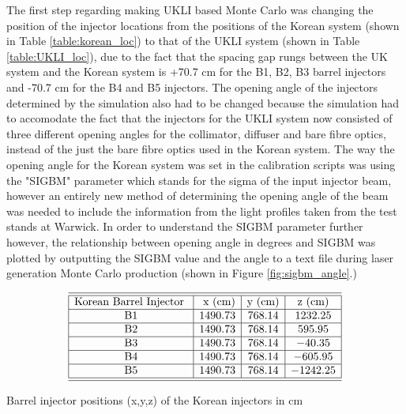 The first step regarding making UKLI based Monte Carlo was changing the position of the injector locations from the positions of the Korean system (shown in Table \ref{table:korean_loc}) to that of the UKLI system (shown in Table \ref{table:UKLI_loc}), due to the fact that the spacing gap rungs between the UK system and the Korean system is +70.7 cm for the B1, B2, B3 barrel injectors and -70.7 cm for the B4 and B5 injectors. The opening angle of the injectors determined by the simulation also had to be changed because the simulation had to accomodate the fact that the injectors for the UKLI system now consisted of three different opening angles for the collimator, diffuser and bare fibre optics, instead of the just the bare fibre optics used in the Korean system. The way the opening angle for the Korean system was set in the calibration scripts was using the "SIGBM" parameter which stands for the sigma of the input injector beam, however an entirely new method of determining the opening angle of the beam was needed to include the information from the light profiles taken from the test stands at Warwick. In order to understand the SIGBM parameter further however, the relationship between opening angle in degrees and SIGBM was plotted by outputting the SIGBM value and the angle to a text file during laser generation Monte Carlo production (shown in Figure \ref{fig:sigbm_angle}.)

\begin{table}[htp]
    $$
\begin{array}{|c|c|c|c|c|c|}  
    \hline \hline{\text {Korean Barrel Injector }} & {\text { x (cm)}} & {\text {y (cm)}} & {\text {z (cm)}}  \tabularnewline
    \hline \text { B1 } & 1490.73 & 768.14 & 1232.25 \\
    \hline \text { B2 } & 1490.73 & 768.14 & 595.95 \\
    \hline \text { B3 } & 1490.73 & 768.14 & -40.35 \\
    \hline \text { B4 } & 1490.73 & 768.14 & -605.95 \\
    \hline \text { B5 } & 1490.73 & 768.14 &  -1242.25 \\
    \hline \hline 
\end{array}
    $$
\caption{Barrel injector positions (x,y,z) of the Korean injectors in cm} 
\label{table:korean_loc}
\end{table}

